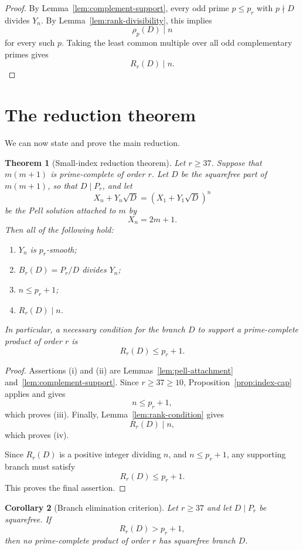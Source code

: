 \documentclass[11pt]{article}
\newtheorem{theorem}{Theorem}[section]
\newtheorem{corollary}[theorem]{Corollary}
\theoremstyle{definition}
\begin{document}
\begin{proof}
By Lemma~\ref{lem:complement-support}, every odd prime $p\le p_r$ with $p\nmid D$ 
divides $Y_n$.  By Lemma~\ref{lem:rank-divisibility}, this implies
\[
        \rho_p(D)\mid n
\]
for every such $p$.  Taking the least common multiple over all odd complementary primes gives
\[
        R_r(D)\mid n.
\]
\end{proof}

\section{The reduction theorem}

We can now state and prove the main reduction.

\begin{theorem}[Small-index reduction theorem]\label{thm:reduction}
Let $r\ge 37$.  Suppose that $m(m+1)$ is prime-complete of order $r$.  Let $D$ be the 
squarefree part of $m(m+1)$, so that $D\mid P_r$, and let
\[
        X_n+Y_n\sqrt D=(X_1+Y_1\sqrt D)^n
\]
be the Pell solution attached to $m$ by
\[
        X_n=2m+1.
\]
Then all of the following hold:
\begin{enumerate}[label=\textup{(\roman*)}]
    \item $Y_n$ is $p_r$-smooth;
    \item $B_r(D)=P_r/D$ divides $Y_n$;
    \item $n\le p_r+1$;
    \item $R_r(D)\mid n$.
\end{enumerate}
In particular, a necessary condition for the branch $D$ to support a prime-complete 
product of order $r$ is
\[
        R_r(D)\le p_r+1.
\]
\end{theorem}

\begin{proof}
Assertions (i) and (ii) are Lemmas~\ref{lem:pell-attachment} and~\ref{lem:complement-support}.  
Since $r \ge 37 \ge 10$, Proposition~\ref{prop:index-cap} applies and gives
\[
        n \le p_r+1,
\]
which proves (iii).  Finally, Lemma~\ref{lem:rank-condition} gives
\[
        R_r(D) \mid n,
\]
which proves (iv).

Since $R_r(D)$ is a positive integer dividing $n$, and $n\le p_r+1$, any 
supporting branch must satisfy
\[
        R_r(D) \le p_r+1.
\]
This proves the final assertion.
\end{proof}

\begin{corollary}[Branch elimination criterion]\label{cor:branch-elimination}
Let $r \ge 37$ and let $D \mid P_r$ be squarefree.  If
\[
        R_r(D)>p_r+1,
\]
then no prime-complete product of order $r$ has squarefree branch $D$.
\end{corollary}
\end{document}
